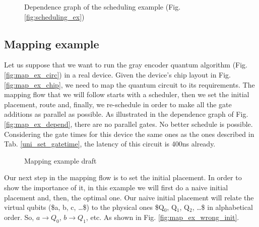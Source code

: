 \begin{itemize}
\begin{figure}
{
}
\caption{Dependence graph of the scheduling example (Fig. \ref{fig:scheduling_ex})}
\label{fig:dependence_graph_ex}
\end{figure}
\end{itemize}


\subsection*{Mapping example}
\label{sec:org496427f}
Let us suppose that we want to run the gray encoder quantum algorithm (Fig. \ref{fig:map_ex_circ}) in a real device.
Given the device's chip layout in Fig. \ref{fig:map_ex_chip}, we need to map the quantum circuit to its requirements.
The mapping flow that we will follow starts with a scheduler, then we set the initial placement, route and, finally, we re-schedule in order to make all the gate additions as parallel as possible.
As illustrated in the dependence graph of Fig. \ref{fig:map_ex_depend}, there are no parallel gates.
No better schedule is possible.
Considering the gate times for this device the same ones as the ones described in Tab. \ref{uni_set_gatetime}, the latency of this circuit is 400ns already.


\begin{figure}[H]
\centering
{}
\label{fig:map_ex_circ}

\label{fig:map_ex_depend}

\label{fig:map_ex_chip}

\label{fig:map_ex_def}
\caption{Mapping example draft}
\end{figure}
Our next step in the mapping flow is to set the initial placement.
In order to show the importance of it, in this example we will first do a naive initial placement and, then, the optimal one.
Our naive initial placement will relate the virtual qubits (\$a, b, c, \ldots{}\$) to the physical ones \$Q\(_{\text{0}}\), Q\(_{\text{1}}\), Q\(_{\text{2}}\), \ldots{}\$ in alphabetical order.
So, \(a \to Q_0\), \(b \to Q_1\), etc.
As shown in Fig. \ref{fig:map_ex_wrong_init}.



